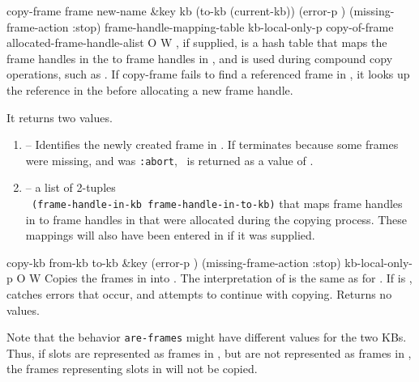 \begin{okbcop}{copy-frame}{ frame new-name \&key kb (to-kb (current-kb)) (error-p \true) (missing-frame-action :stop) frame-handle-mapping-table kb-local-only-p} { copy-of-frame allocated-frame-handle-alist } { O } { W } {  }
   , if supplied, is a hash table that maps
   the frame handles in the  to frame handles in , and
   is used during compound copy operations, such as .  If
   copy-frame fails to find a referenced frame in , it looks up
   the reference in the  before allocating 
   a new frame handle.

   It returns two values.
   \begin{enumerate}
   \item {} -- Identifies the newly created frame in
      .  If  terminates because some frames were
      missing, and  was {\tt :abort},
      \false\ is returned as a value of .
   \item {} -- a list of 2-tuples\\ {\tt
      (frame-handle-in-kb frame-handle-in-to-kb)} that maps frame handles in
       to frame handles in  that were allocated during
      the copying process.  These mappings will also have been entered in
       if it was supplied.
   \end{enumerate} 
\end{okbcop}

\begin{okbcop}{copy-kb}{ from-kb to-kb \&key (error-p \true) (missing-frame-action :stop) kb-local-only-p} { \void } { O } { W } {  }
Copies the frames in  into .
   The interpretation of  is the same as
   for .  If  is \false, catches errors that
   occur, and attempts to continue with copying.  Returns no values.

   Note that the behavior {\tt are-frames} might have different values for
   the two KBs.  Thus, if slots are represented as frames in
   , but are not represented as frames in , the frames
   representing slots in  will not be copied.
\end{okbcop}


